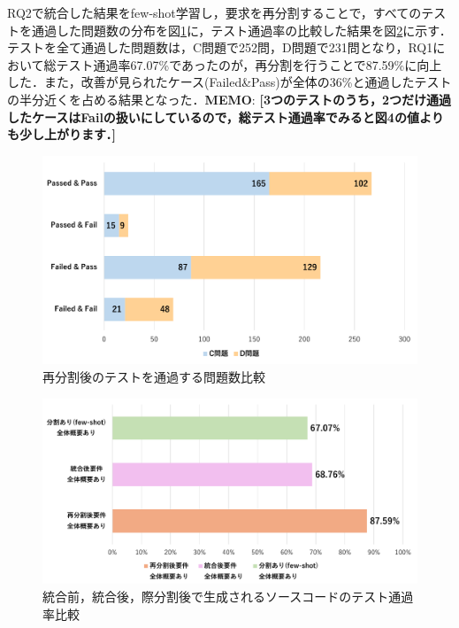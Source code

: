 \documentclass[submit,techrep,noauthor]{ipsj}
\newcommand{\memo}[1]{\colorbox{magenta!30}{{\bf MEMO}:}{\color{red!50} {\textbf{[#1]}}}}
\begin{document}
RQ2で統合した結果をfew-shot学習し，要求を再分割することで，すべてのテストを通過した問題数の分布を図\ref{rq3_1}に，テスト通過率の比較した結果を図\ref{rq3_2}に示す．テストを全て通過した問題数は，C問題で252問，D問題で231問となり，RQ1において総テスト通過率67.07\%であったのが，再分割を行うことで87.59\%に向上した．また，改善が見られたケース(Failed\&Pass)が全体の36\%と通過したテストの半分近くを占める結果となった．\memo{3つのテストのうち，2つだけ通過したケースはFailの扱いにしているので，総テスト通過率でみると図4の値よりも少し上がります．}





\begin{figure}[t]
    \centering
    \includegraphics[width=1.0\linewidth]{./Toyoshima_fig/RQ3_1.pdf}
    \caption{再分割後のテストを通過する問題数比較}
    \label{rq3_1}
\end{figure}

\begin{figure}[t]
    \centering
    \includegraphics[width=1.0\linewidth]{./Toyoshima_fig/RQ3_2.pdf}
    \caption{統合前，統合後，際分割後で生成されるソースコードのテスト通過率比較}
    \label{rq3_2}
\end{figure}
\end{document}
